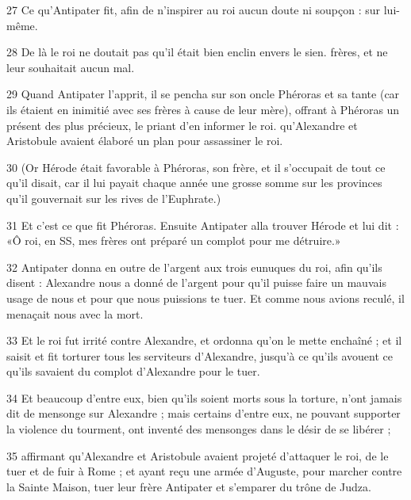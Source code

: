 \par 27 Ce qu'Antipater fit, afin de n'inspirer au roi aucun doute ni soupçon : sur lui-même.

\par 28 De là le roi ne doutait pas qu'il était bien enclin envers le sien. frères, et ne leur souhaitait aucun mal.

\par 29 Quand Antipater l'apprit, il se pencha sur son oncle Phéroras et sa tante (car ils étaient en inimitié avec ses frères à cause de leur mère), offrant à Phéroras un présent des plus précieux, le priant d'en informer le roi. qu'Alexandre et Aristobule avaient élaboré un plan pour assassiner le roi.

\par 30 (Or Hérode était favorable à Phéroras, son frère, et il s'occupait de tout ce qu'il disait, car il lui payait chaque année une grosse somme sur les provinces qu'il gouvernait sur les rives de l'Euphrate.)

\par 31 Et c'est ce que fit Phéroras. Ensuite Antipater alla trouver Hérode et lui dit : «Ô roi, en SS, mes frères ont préparé un complot pour me détruire.»

\par 32 Antipater donna en outre de l'argent aux trois eunuques du roi, afin qu'ils disent : Alexandre nous a donné de l'argent pour qu'il puisse faire un mauvais usage de nous et pour que nous puissions te tuer. Et comme nous avions reculé, il menaçait nous avec la mort.

\par 33 Et le roi fut irrité contre Alexandre, et ordonna qu'on le mette enchaîné ; et il saisit et fit torturer tous les serviteurs d'Alexandre, jusqu'à ce qu'ils avouent ce qu'ils savaient du complot d'Alexandre pour le tuer.

\par 34 Et beaucoup d'entre eux, bien qu'ils soient morts sous la torture, n'ont jamais dit de mensonge sur Alexandre ; mais certains d'entre eux, ne pouvant supporter la violence du tourment, ont inventé des mensonges dans le désir de se libérer ;

\par 35 affirmant qu'Alexandre et Aristobule avaient projeté d'attaquer le roi, de le tuer et de fuir à Rome ; et ayant reçu une armée d'Auguste, pour marcher contre la Sainte Maison, tuer leur frère Antipater et s'emparer du trône de Judza.

